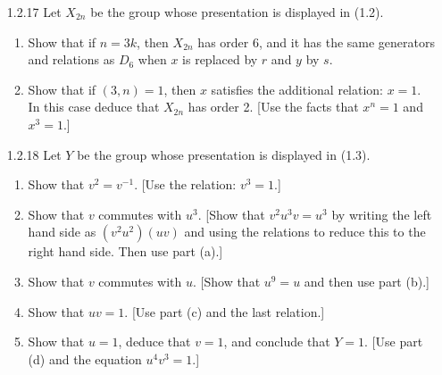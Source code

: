 \begin{enumerate}
      \textbf{Proof.} We can think of $x_1$ as $r$ and $y_1$ as $s$. In $D_4$,
      we know that $r^2 = s^2 = 1$ and $rs = sr^{-1}$, and since
      ${x_1}^2 = {y_1}^2 = 1$, it only remains to show that
      $x_1x_2 = x_2{x_1}^{-1}$. Note that ${y_1}^{-1} = y_1$ because
      ${y_1}^2 = 1$. By hypothesis, we have that $x_1y_1x_1y_1 = 1$,
      so that $x_1y_1 = {y_1}^{-1}{x_1}^{-1} = y_1{x_1}^{-1}$, and, in 
      conclusion, $S = D_4$. \qed
   \item[1.2.17]  Let $X_{2n}$ be the group whose presentation is displayed in
                  (1.2).
                  \begin{enumerate}
                     \item Show that if $n = 3k$, then $X_{2n}$ has order 6, and
                           it has the same generators and relations as $D_6$
                           when $x$ is replaced by $r$ and $y$ by $s$.
                     \item Show that if $(3, n) = 1$, then $x$ satisfies the
                           additional relation: $x = 1$. In this case deduce
                           that $X_{2n}$ has order 2. [Use the facts that
                           $x^n = 1$ and $x^3 = 1$.]
                  \end{enumerate}
   \item[1.2.18]  Let $Y$ be the group whose presentation is displayed in (1.3).
                  \begin{enumerate}
                     \item Show that $v^2 = v^{-1}$.
                           [Use the relation: $v^3 = 1$.]
                     \item Show that $v$ commutes with $u^3$. [Show that
                           $v^2u^3v = u^3$ by writing the left hand side as
                           $(v^2u^2)(uv)$ and using the relations to reduce this
                           to the right hand side. Then use part (a).]
                     \item Show that $v$ commutes with $u$. [Show that $u^9 = u$
                           and then use part (b).]
                     \item Show that $uv = 1$. [Use part (c) and the last
                           relation.]
                     \item Show that $u = 1$, deduce that $v = 1$, and conclude
                           that $Y = 1$. [Use part (d) and the equation
                           $u^4v^3 = 1$.]
                  \end{enumerate}
\end{enumerate}
